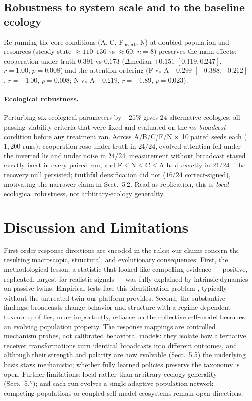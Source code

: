 \documentclass{svproc}
\begin{document}
\subsection{Robustness to system scale and to the baseline ecology}
Re-running the core conditions (A, C, F$_{\mathrm{invert}}$, N) at doubled
population and resources (steady-state $\approx 110$--$130$ vs $\approx 60$;
$n=8$) preserves the main effects: cooperation under truth $0.391$ vs
$0.173$ ($\Delta$median $+0.151$ $[0.119, 0.247]$, $r=1.00$, $p=0.008$) and
the attention ordering (F vs A $-0.299$ $[-0.388, -0.212]$, $r=-1.00$,
$p=0.008$; N vs A $-0.219$, $r=-0.89$, $p=0.023$).

\paragraph{Ecological robustness.} Perturbing six ecological parameters by
$\pm25\%$ gives $24$ alternative ecologies, all passing viability criteria that
were fixed and evaluated on the \emph{no-broadcast} condition before any
treatment ran. Across A/B/C/F/N $\times$ 10 paired seeds each ($1{,}200$ runs):
cooperation rose under truth in $24/24$, evolved attention fell under the
inverted lie and under noise in $24/24$, measurement without broadcast stayed
exactly inert in every paired run, and F$\leq$N$\leq$C$\leq$A held exactly in
$21/24$. The recovery null persisted; truthful densification did not ($16/24$
correct-signed), motivating the narrower claim in Sect.~5.2. Read as
replication, this is \emph{local} ecological robustness, not
arbitrary-ecology generality.

\section{Discussion and Limitations}
First-order response directions are encoded in the rules; our claims concern
the resulting macroscopic, structural, and evolutionary consequences. First,
the methodological lesson: a statistic that looked like compelling
evidence --- positive, replicated, largest for realistic signals --- was fully
explained by intrinsic dynamics on passive twins. Empirical tests face this
identification problem \cite{cheng2024causal}, typically without the
untreated twin our platform provides. Second, the substantive findings:
broadcasts change behavior and structure with a regime-dependent taxonomy of
lies; more importantly, reliance on the collective self-model becomes an
evolving population property.
The response mappings are controlled mechanism probes, not calibrated
behavioral models: they isolate how alternative receiver transformations turn
identical broadcasts into different outcomes, and although their strength and
polarity are now evolvable (Sect.~5.5) the underlying basis stays mechanistic;
whether fully learned policies preserve the taxonomy is open. Further
limitations: local rather than arbitrary-ecology generality (Sect.~5.7); and
each run evolves a single adaptive population network --- competing
populations or coupled self-model ecosystems remain open directions.
\end{document}
